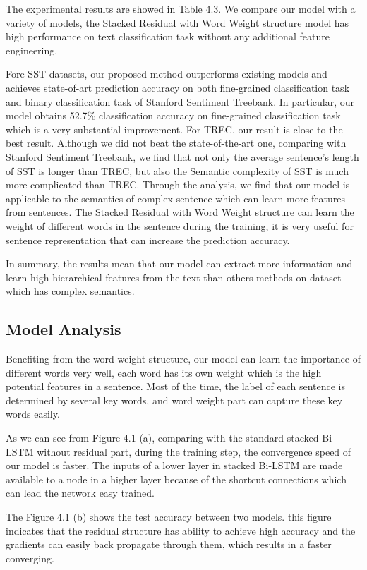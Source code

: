 \documentclass[senior]{IPSstyle}
\begin{document}
The experimental results are showed in Table 4.3. We compare our model with a variety of models, the Stacked Residual with Word Weight structure model has high performance on text classification task without any additional feature engineering.

Fore SST datasets, our proposed method outperforms existing models and achieves state-of-art prediction accuracy on both fine-grained classification task and binary classification task of Stanford Sentiment Treebank. In particular, our model obtains 52.7\% classification accuracy on fine-grained classification task which is a very substantial improvement. For TREC, our result is close to the best result. Although we did not beat the state-of-the-art one, comparing with Stanford Sentiment Treebank, we find that not only the average sentence’s length of SST is longer than TREC, but also the Semantic complexity of SST is much more complicated than TREC. Through the analysis, we find that our model is applicable to the semantics of complex sentence which can learn more features from sentences. The Stacked Residual with Word Weight structure can learn the weight of different words in the sentence during the training, it is very useful for sentence representation that can increase the prediction accuracy. 

In summary, the results mean that our model can extract more information and learn high hierarchical features from the text than others methods on dataset which has complex semantics.





\subsection{Model Analysis}
Benefiting from the word weight structure, our model can learn the importance of different words very well, each word has its own weight which is the high potential features in a sentence. Most of the time, the label of each sentence is determined by several key words, and word weight part can capture these key words easily.

As we can see from Figure 4.1 (a), comparing with the standard stacked Bi-LSTM without residual part, during the training step, the convergence speed of our model is faster. The inputs of a lower layer in stacked Bi-LSTM are made available to a node in a higher layer because of the shortcut connections which can lead the network easy trained.

The Figure 4.1 (b) shows the test accuracy between two models. this figure indicates that the residual structure has ability to achieve high accuracy and the gradients can easily back propagate through them, which results in a faster converging.
\end{document}
